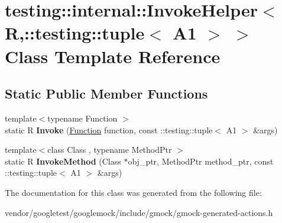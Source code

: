 \hypertarget{classtesting_1_1internal_1_1InvokeHelper_3_01R_00_1_1testing_1_1tuple_3_01A1_01_4_01_4}{}\section{testing\+:\+:internal\+:\+:Invoke\+Helper$<$ R,\+:\+:testing\+:\+:tuple$<$ A1 $>$ $>$ Class Template Reference}
\label{classtesting_1_1internal_1_1InvokeHelper_3_01R_00_1_1testing_1_1tuple_3_01A1_01_4_01_4}
\subsection*{Static Public Member Functions}
\begin{DoxyCompactItemize}
\item 
{\footnotesize template$<$typename Function $>$ }\\static R {\bfseries Invoke} (\hyperlink{structtesting_1_1internal_1_1Function}{Function} function, const \+::testing\+::tuple$<$ A1 $>$ \&args)\hypertarget{classtesting_1_1internal_1_1InvokeHelper_3_01R_00_1_1testing_1_1tuple_3_01A1_01_4_01_4_a479bcf0c0dc4205acd354d3ec9646793}{}\label{classtesting_1_1internal_1_1InvokeHelper_3_01R_00_1_1testing_1_1tuple_3_01A1_01_4_01_4_a479bcf0c0dc4205acd354d3ec9646793}

\item 
{\footnotesize template$<$class Class , typename Method\+Ptr $>$ }\\static R {\bfseries Invoke\+Method} (Class $\ast$obj\+\_\+ptr, Method\+Ptr method\+\_\+ptr, const \+::testing\+::tuple$<$ A1 $>$ \&args)\hypertarget{classtesting_1_1internal_1_1InvokeHelper_3_01R_00_1_1testing_1_1tuple_3_01A1_01_4_01_4_a17192a39bf197683056c490641a57de2}{}\label{classtesting_1_1internal_1_1InvokeHelper_3_01R_00_1_1testing_1_1tuple_3_01A1_01_4_01_4_a17192a39bf197683056c490641a57de2}

\end{DoxyCompactItemize}


The documentation for this class was generated from the following file\+:\begin{DoxyCompactItemize}
\item 
vendor/googletest/googlemock/include/gmock/gmock-\/generated-\/actions.\+h\end{DoxyCompactItemize}
